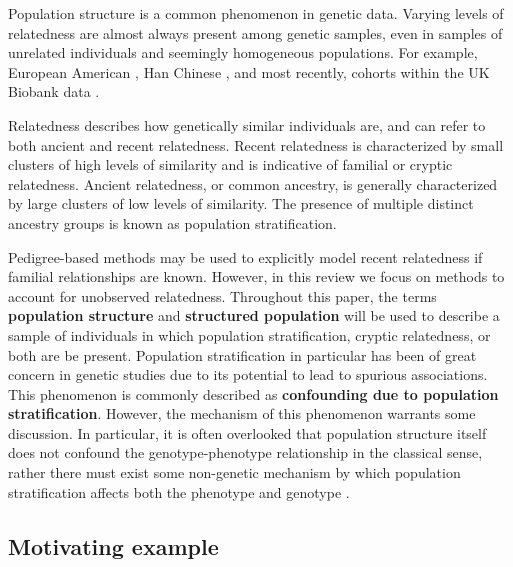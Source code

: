 Population structure is a common phenomenon in genetic data. Varying levels of relatedness are almost always present among genetic samples, even in samples of unrelated individuals and seemingly homogeneous populations. For example, European American \cite{campbell2005demonstrating}, Han Chinese \cite{xu2009genomic, chen2009genetic}, and most recently, cohorts within the UK Biobank data \cite{haworth2019apparent}.

Relatedness describes how genetically similar individuals are, and can refer to both ancient and recent relatedness.  Recent relatedness is characterized by small clusters of high levels of similarity and is indicative of familial or cryptic relatedness. Ancient relatedness, or common ancestry, is generally characterized by large clusters of low levels of similarity. The presence of multiple distinct ancestry groups is known as population stratification. 

Pedigree-based methods may be used to explicitly model recent relatedness if familial relationships are known. However, in this review we focus on methods to account for unobserved relatedness. Throughout this paper, the terms \textbf{population structure} and \textbf{structured population} will be used to describe a sample of individuals in which population stratification, cryptic relatedness, or both are be present. Population stratification in particular has been of great concern in genetic studies due to its potential to lead to spurious associations. This phenomenon is commonly described as \textbf{confounding due to population stratification}. However, the mechanism of this phenomenon warrants some discussion. In particular, it is often overlooked that population structure itself does not confound the genotype-phenotype relationship in the classical sense, rather there must exist some non-genetic mechanism by which population stratification affects both the phenotype and genotype \cite{barton2019population, vilhjalmsson2012nature}. \\



\subsection{Motivating example}

